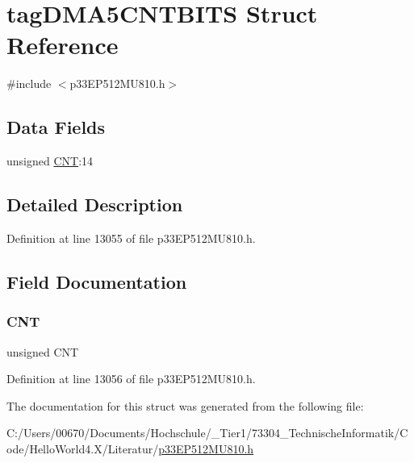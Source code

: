 \hypertarget{structtag_d_m_a5_c_n_t_b_i_t_s}{}\section{tag\+D\+M\+A5\+C\+N\+T\+B\+I\+TS Struct Reference}
\label{structtag_d_m_a5_c_n_t_b_i_t_s}


{\ttfamily \#include $<$p33\+E\+P512\+M\+U810.\+h$>$}

\subsection*{Data Fields}
\begin{DoxyCompactItemize}
\item 
unsigned \hyperlink{structtag_d_m_a5_c_n_t_b_i_t_s_a30be39d82c244f19fd98dd74227487f6}{C\+NT}\+:14
\end{DoxyCompactItemize}


\subsection{Detailed Description}


Definition at line 13055 of file p33\+E\+P512\+M\+U810.\+h.



\subsection{Field Documentation}
\mbox{\label{structtag_d_m_a5_c_n_t_b_i_t_s_a30be39d82c244f19fd98dd74227487f6}} 
\subsubsection{\texorpdfstring{C\+NT}{CNT}}
{\footnotesize\ttfamily unsigned C\+NT}



Definition at line 13056 of file p33\+E\+P512\+M\+U810.\+h.



The documentation for this struct was generated from the following file\+:\begin{DoxyCompactItemize}
\item 
C\+:/\+Users/00670/\+Documents/\+Hochschule/\+\_\+\+Tier1/73304\+\_\+\+Technische\+Informatik/\+Code/\+Hello\+World4.\+X/\+Literatur/\hyperlink{p33_e_p512_m_u810_8h}{p33\+E\+P512\+M\+U810.\+h}\end{DoxyCompactItemize}

